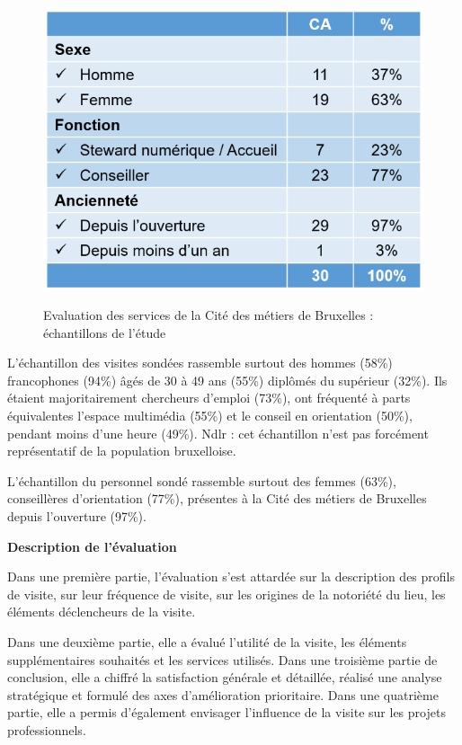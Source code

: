 \documentclass[french,a4paper,12pt]{article}
\begin{document}
{\begin{center}
\begin{figure}
\includegraphics[scale=1.4]{8-cdm-echantillon3.PNG}
\end{figure}
\begin{figure}[h]
\caption{Evaluation des services de la Cité des métiers de Bruxelles : échantillons de l'étude}
\end{figure}
\end{center}

\quad L’échantillon des visites sondées rassemble surtout des hommes (58\%) francophones (94\%) âgés de 30 à 49 ans (55\%) diplômés du supérieur (32\%). Ils étaient majoritairement chercheurs d’emploi (73\%), ont fréquenté à parts équivalentes l’espace multimédia (55\%) et le conseil en orientation (50\%), pendant moins d’une heure (49\%). Ndlr : cet échantillon n’est pas forcément représentatif de la population bruxelloise.

\quad L’échantillon du personnel sondé rassemble surtout des femmes (63\%), conseillères d’orientation (77\%), présentes à la Cité des métiers de Bruxelles depuis l’ouverture (97\%).

\textbf{Description de l’évaluation}

\quad Dans une première partie, l’évaluation s’est attardée sur la description des profils de visite, sur leur fréquence de visite, sur les origines de la notoriété du lieu, les éléments déclencheurs de la visite. 

\quad Dans une deuxième partie, elle a évalué l’utilité de la visite, les éléments supplémentaires souhaités et les services utilisés. Dans une troisième partie de conclusion, elle a chiffré la satisfaction générale et détaillée, réalisé une analyse stratégique et formulé des axes d’amélioration prioritaire. Dans une quatrième partie, elle a permis d’également envisager l’influence de la visite sur les projets professionnels. 

}
\end{document}
